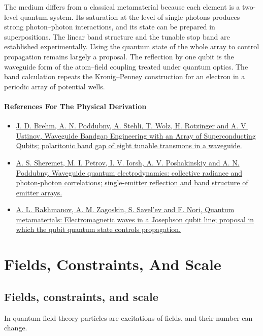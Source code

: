 \documentclass[11pt,oneside]{book}
\begin{document}
The medium differs from a classical metamaterial because each element is a two-level quantum system. Its saturation at the level of single photons produces strong photon--photon interactions, and its state can be prepared in superpositions. The linear band structure and the tunable stop band are established experimentally. Using the quantum state of the whole array to control propagation remains largely a proposal. The reflection by one qubit is the waveguide form of the atom--field coupling treated under quantum optics. The band calculation repeats the Kronig--Penney construction for an electron in a periodic array of potential wells.

\subsection*{References For The Physical Derivation}
\begin{itemize}
\item \href{https://arxiv.org/abs/2006.03330}{J. D. Brehm, A. N. Poddubny, A. Stehli, T. Wolz, H. Rotzinger and A. V. Ustinov, Waveguide Bandgap Engineering with an Array of Superconducting Qubits; polaritonic band gap of eight tunable transmons in a waveguide.}
\item \href{https://arxiv.org/abs/2103.06824}{A. S. Sheremet, M. I. Petrov, I. V. Iorsh, A. V. Poshakinskiy and A. N. Poddubny, Waveguide quantum electrodynamics: collective radiance and photon-photon correlations; single-emitter reflection and band structure of emitter arrays.}
\item \href{https://arxiv.org/abs/0709.1314}{A. L. Rakhmanov, A. M. Zagoskin, S. Savel'ev and F. Nori, Quantum metamaterials: Electromagnetic waves in a Josephson qubit line; proposal in which the qubit quantum state controls propagation.}
\end{itemize}





\part{Fields, Constraints, And Scale}

\chapter{Fields, constraints, and scale}

In quantum field theory particles are excitations of fields, and their number can change.
\end{document}
